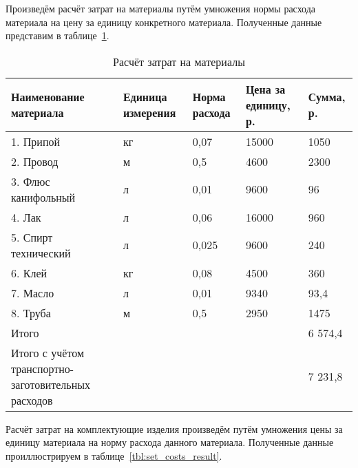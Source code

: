 Произведём расчёт затрат на материалы путём умножения нормы расхода материала
на цену за единицу конкретного материала. Полученные данные представим в
таблице~\ref{tbl:material_costs_result}.

\begin{table}[h!]
  \caption{Расчёт затрат на материалы}
  \label{tbl:material_costs_result}
  \centering
  \small{
    \begin{tabular}{| p{} | p{} |
                      p{} | p{} | p{} |}
      \hline
      Наименование материала & Единица \newline измерения &
      Норма расхода & Цена за \newline единицу, р. & Сумма, р. \\ \hline

      1. Припой             & кг & 0,07  & 15000 & 1050   \\ \hline
      2. Провод             & м  & 0,5   & 4600  & 2300   \\ \hline
      3. Флюс канифольный   & л  & 0,01  & 9600  & 96     \\ \hline
      4. Лак                & л  & 0,06  & 16000 & 960    \\ \hline
      5. Спирт технический  & л  & 0,025 & 9600  & 240    \\ \hline
      6. Клей               & кг & 0,08  & 4500  & 360    \\ \hline
      7. Масло              & л  & 0,01  & 9340  & 93,4   \\ \hline
      8. Труба              & м  & 0,5   & 2950  & 1475   \\ \hline
      Итого                 &    &       &       & 6 574,4 \\ \hline
      Итого с учётом \newline
      транспортно-заготовительных расходов & & & & 7 231,8 \\ \hline

    \end{tabular}
  }
\end{table}

Расчёт затрат на комплектующие изделия произведём путём умножения цены за единицу
материала на норму расхода данного материала. Полученные данные проиллюстрируем
в таблице~\ref{tbl:set_costs_result}.


